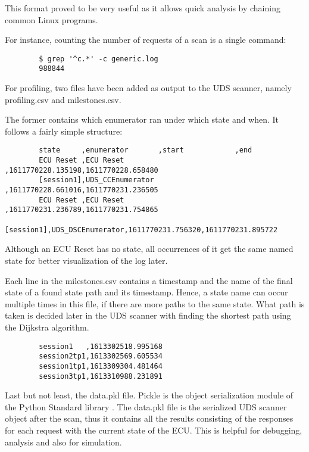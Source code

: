 This format proved to be very useful as it allows quick analysis by chaining common Linux programs.

For instance, counting the number of requests of a scan is a single command:
\begin{samepage}
    \begin{verbatim}
        $ grep '^c.*' -c generic.log
        988844
    \end{verbatim}
\end{samepage}

For profiling, two files have been added as output to the UDS scanner, namely profiling.csv and milestones.csv.

The former contains which enumerator ran under which state and when. It follows a fairly simple structure:

\begin{samepage}
    \begin{verbatim}
        state     ,enumerator       ,start            ,end
        ECU Reset ,ECU Reset        ,1611770228.135198,1611770228.658480
        [session1],UDS_CCEnumerator ,1611770228.661016,1611770231.236505
        ECU Reset ,ECU Reset        ,1611770231.236789,1611770231.754865
        [session1],UDS_DSCEnumerator,1611770231.756320,1611770231.895722
    \end{verbatim}
\end{samepage}

Although an ECU Reset has no state, all occurrences of it get the same named state for better visualization of the log later.

Each line in the milestones.csv contains a timestamp and the name of the final state of a found state path and its timestamp. Hence, a state name can occur multiple times in this file, if there are more paths to the same state. What path is taken is decided later in the UDS scanner with finding the shortest path using the Dijkstra algorithm.

\begin{samepage}
    \begin{verbatim}
        session1   ,1613302518.995168
        session2tp1,1613302569.605534
        session1tp1,1613309304.481464
        session3tp1,1613310988.231891
    \end{verbatim}
\end{samepage}

Last but not least, the data.pkl file. Pickle is the object serialization module of the Python Standard library \cite{pickle}. The data.pkl file is the serialized UDS scanner object after the scan, thus it contains all the results consisting of the responses for each request with the current state of the ECU. This is helpful for debugging, analysis and also for simulation.


